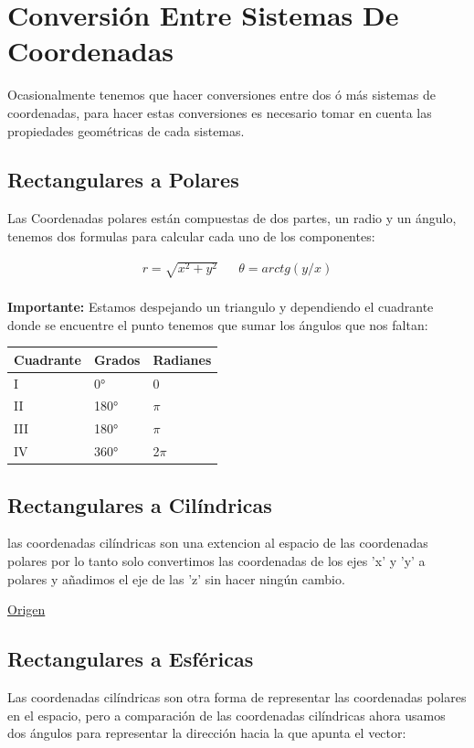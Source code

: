 \documentclass{article}
\begin{document}
\section{Conversión Entre Sistemas De Coordenadas}
\label{sec:org2a4c301}
Ocasionalmente tenemos que hacer conversiones entre dos ó más sistemas de coordenadas, para hacer estas conversiones es necesario tomar en cuenta las propiedades geométricas de cada sistemas.

\subsection{Rectangulares a Polares}
\label{sec:org247b524}
Las Coordenadas polares están compuestas de dos partes, un radio y un ángulo, tenemos dos formulas para calcular cada uno de los componentes: 

\[\begin{aligned}
 r = \sqrt{x^2+y^2} && \theta = arctg\left(y/x\right) \\
\end{aligned}\] 

\textbf{Importante:} Estamos despejando un triangulo y dependiendo el cuadrante donde se encuentre el punto tenemos que sumar los ángulos que nos faltan: 

\begin{center}
\label{tab:orga0c1d5f}
\begin{tabular}{lll}
Cuadrante & Grados & Radianes\\
\hline
I & 0° & 0\\
II & 180° & \(\pi\)\\
III & 180° & \(\pi\)\\
IV & 360° & 2\(\pi\)\\
\end{tabular}
\end{center}

\subsection{Rectangulares a Cilíndricas}
\label{sec:org8f482e1}
las coordenadas cilíndricas son una extencion al espacio de las coordenadas polares por lo tanto solo convertimos las coordenadas de los ejes 'x' y 'y' a polares y añadimos el eje de las 'z' sin hacer ningún cambio.

\href{http://www.learningaboutelectronics.com/Articulos/Calculadora-de-conversion-de-coordenadas-cartesianas-a-cilindricas.php}{Origen}

\subsection{Rectangulares a Esféricas}
\label{sec:org2df0e53}
Las coordenadas cilíndricas son otra forma de representar las coordenadas polares en el espacio, pero a comparación de las coordenadas cilíndricas ahora usamos dos ángulos para representar la dirección hacia la que apunta el vector: 
\end{document}
